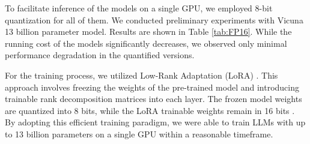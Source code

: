 \documentclass[11pt]{article}
\begin{document}
\begin{table*}[tb]
\small
\centering
\caption{Zero-shot performance of Vicuna using 8-Bits quantification and the orifinal float16 weights. The best results are highlighted in \textbf{bold}, and scores that surpass the Random baseline are indicated with \underline{underline}.}
\label{tab:FP16}
\end{table*} 
To facilitate inference of the models on a single GPU, we employed 8-bit quantization \cite{DBLP:journals/corr/abs-2208-07339} for all of them. We conducted preliminary experiments with Vicuna 13 billion parameter model. Results are shown in Table \ref{tab:FP16}. While the running cost of the models significantly decreases, we observed only minimal performance degradation in the quantified versions.

For the training process, we utilized Low-Rank Adaptation (LoRA) \cite{DBLP:conf/iclr/HuSWALWWC22}. This approach involves freezing the weights of the pre-trained model and introducing trainable rank decomposition matrices into each layer. The frozen model weights are quantized into 8 bits, while the LoRA trainable weights remain in 16 bits \cite{DBLP:journals/corr/abs-2305-14314}. By adopting this efficient training paradigm, we were able to train LLMs with up to 13 billion parameters on a single GPU within a reasonable timeframe.
\end{document}
